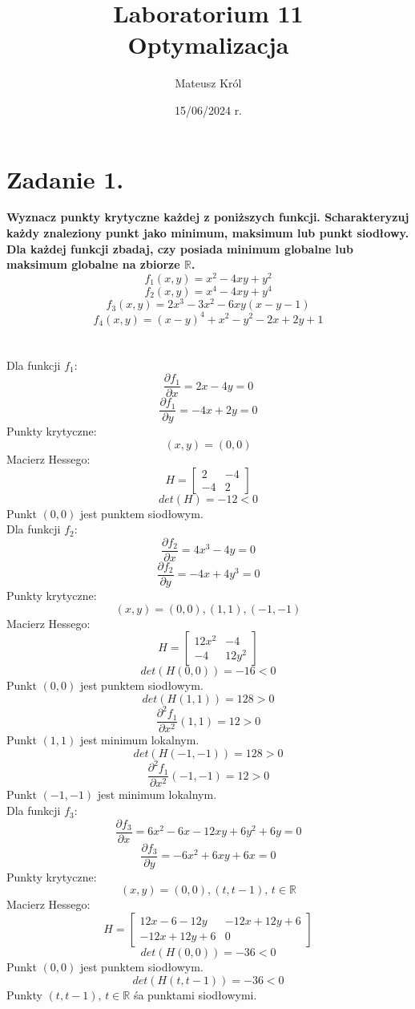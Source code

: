 \documentclass{article}
\title{%
Laboratorium 11\\
  \huge Optymalizacja}
\author{Mateusz Król}
\date{15/06/2024 r.}
\begin{document}
\maketitle

 
\section*{Zadanie 1.}
\textbf{Wyznacz punkty krytyczne każdej z poniższych funkcji.
Scharakteryzuj każdy znaleziony punkt jako minimum, maksimum lub punkt siodłowy.
Dla każdej funkcji zbadaj, czy posiada minimum globalne lub maksimum globalne na zbiorze $\mathbb{R}$.}
$$f_1(x, y) = x^2 - 4xy + y^2$$
$$f_2(x, y) = x^4 - 4xy + y^4$$
$$f_3(x, y) = 2x^3 - 3x^2 -6xy(x-y-1)$$
$$f_4(x, y) = (x-y)^4 + x^2 - y^2 - 2x + 2y +1$$
\\\\
Dla funkcji $f_1$:
$$\frac{\partial f_1}{\partial x} = 2x-4y = 0$$
$$\frac{\partial f_1}{\partial y} = -4x+2y = 0$$
Punkty krytyczne:
$$(x, y) = (0, 0)$$
Macierz Hessego:
$$H = \begin{bmatrix}
  2 & -4 \\
  -4 & 2 
\end{bmatrix}$$
$$det(H) = -12 < 0$$
Punkt $(0, 0)$ jest punktem siodłowym. \\


Dla funkcji $f_2$:
$$\frac{\partial f_2}{\partial x} = 4x^3-4y = 0$$
$$\frac{\partial f_2}{\partial y} = -4x+4y^3 = 0$$
Punkty krytyczne:
$$(x, y) = (0, 0), (1, 1), (-1, -1)$$
Macierz Hessego:
$$H = \begin{bmatrix}
  12x^2 & -4 \\
  -4 & 12y^2
\end{bmatrix}$$
$$det(H(0, 0)) = -16 < 0$$
Punkt $(0, 0)$ jest punktem siodłowym.
$$det(H(1, 1)) = 128 > 0$$
$$\frac{\partial^2 f_1}{\partial x^2}(1, 1) = 12 > 0$$
Punkt $(1, 1)$ jest minimum lokalnym.
$$det(H(-1, -1)) = 128 > 0$$
$$\frac{\partial^2 f_1}{\partial x^2}(-1, -1) = 12 > 0$$
Punkt $(-1, -1)$ jest minimum lokalnym. \\

Dla funkcji $f_3$:
$$\frac{\partial f_3}{\partial x} = 6x^2-6x-12xy+6y^2+6y = 0$$
$$\frac{\partial f_3}{\partial y} = -6x^2+6xy+6x = 0$$
Punkty krytyczne:
$$(x, y) = (0, 0), (t, t-1) \text{, } t\in \mathbb{R}$$
Macierz Hessego:
$$H = \begin{bmatrix}
  12x-6-12y & -12x+12y+6 \\
  -12x+12y+6 & 0 
\end{bmatrix}$$
$$det(H(0, 0)) = -36 < 0$$
Punkt $(0, 0)$ jest punktem siodłowym. \\
$$det(H(t, t-1)) = -36 < 0$$
Punkty $(t, t-1) \text{, } t\in \mathbb{R}$ śa punktami siodłowymi. \\
\end{document}
